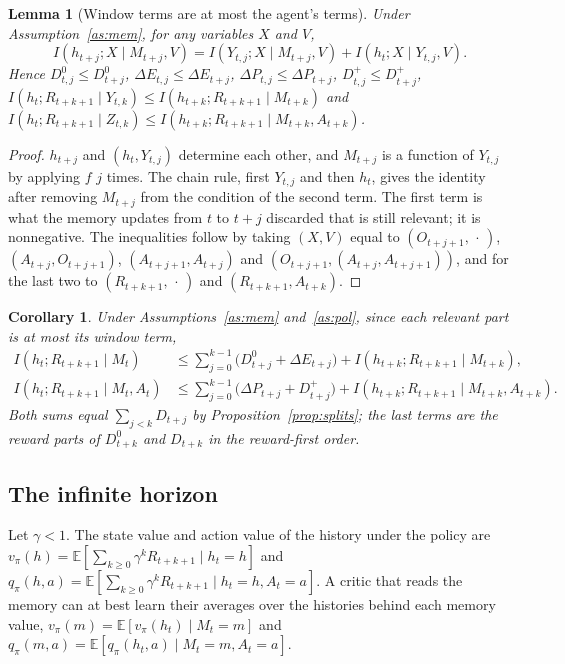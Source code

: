 \documentclass{article}
\newtheorem{lemma}{Lemma}
\newtheorem{corollary}{Corollary}
\theoremstyle{definition}
\theoremstyle{remark}
\newcommand{\E}{\mathbb{E}}
\newcommand{\dE}{\Delta E}
\newcommand{\dP}{\Delta P}
\begin{document}
\begin{lemma}[Window terms are at most the agent's terms]\label{lem:window}
Under Assumption~\ref{as:mem}, for any variables $X$ and $V$,
\[
I(h_{t+j};X\mid M_{t+j},V)=I(Y_{t,j};X\mid M_{t+j},V)+I(h_t;X\mid Y_{t,j},V).
\]
Hence $D^0_{t,j}\le D^0_{t+j}$, $\dE_{t,j}\le\dE_{t+j}$, $\dP_{t,j}\le\dP_{t+j}$, $D^+_{t,j}\le D^+_{t+j}$, $I(h_t;R_{t+k+1}\mid Y_{t,k})\le I(h_{t+k};R_{t+k+1}\mid M_{t+k})$ and $I(h_t;R_{t+k+1}\mid Z_{t,k})\le I(h_{t+k};R_{t+k+1}\mid M_{t+k},A_{t+k})$.
\end{lemma}

\begin{proof}
$h_{t+j}$ and $(h_t,Y_{t,j})$ determine each other, and $M_{t+j}$ is a function of $Y_{t,j}$ by applying $f$ $j$ times. The chain rule, first $Y_{t,j}$ and then $h_t$, gives the identity after removing $M_{t+j}$ from the condition of the second term. The first term is what the memory updates from $t$ to $t+j$ discarded that is still relevant; it is nonnegative. The inequalities follow by taking $(X,V)$ equal to $(O_{t+j+1},\,\cdot\,)$, $(A_{t+j},O_{t+j+1})$, $(A_{t+j+1},A_{t+j})$ and $(O_{t+j+1},(A_{t+j},A_{t+j+1}))$, and for the last two to $(R_{t+k+1},\,\cdot\,)$ and $(R_{t+k+1},A_{t+k})$.
\end{proof}

\begin{corollary}\label{cor:k-steps}
Under Assumptions~\ref{as:mem} and~\ref{as:pol}, since each relevant part is at most its window term,
\begin{align*}
I(h_t;R_{t+k+1}\mid M_t)&\le\sum_{j=0}^{k-1}\big(D^0_{t+j}+\dE_{t+j}\big)+I(h_{t+k};R_{t+k+1}\mid M_{t+k}),\\
I(h_t;R_{t+k+1}\mid M_t,A_t)&\le\sum_{j=0}^{k-1}\big(\dP_{t+j}+D^+_{t+j}\big)+I(h_{t+k};R_{t+k+1}\mid M_{t+k},A_{t+k}).
\end{align*}
Both sums equal $\sum_{j<k}D_{t+j}$ by Proposition~\ref{prop:splits}; the last terms are the reward parts of $D^0_{t+k}$ and $D_{t+k}$ in the reward-first order.
\end{corollary}

\subsection{The infinite horizon}

Let $\gamma<1$. The state value and action value of the history under the policy are $v_\pi(h)=\E[\sum_{k\ge0}\gamma^kR_{t+k+1}\mid h_t=h]$ and $q_\pi(h,a)=\E[\sum_{k\ge0}\gamma^kR_{t+k+1}\mid h_t=h,A_t=a]$. A critic that reads the memory can at best learn their averages over the histories behind each memory value, $v_\pi(m)=\E[v_\pi(h_t)\mid M_t=m]$ and $q_\pi(m,a)=\E[q_\pi(h_t,a)\mid M_t=m,A_t=a]$.
\end{document}
